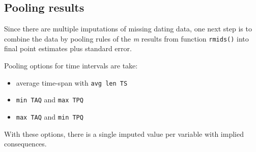 \documentclass[a4paper,11pt]{memoir}
\providecommand{\tightlist}{%
  \setlength{\itemsep}{0pt}\setlength{\parskip}{0pt}}
\begin{document}
\hypertarget{pooling-results}{%
\subsection{Pooling results}\label{pooling-results}}

Since there are multiple imputations of missing dating data, one next
step is to combine the data by pooling rules of the \emph{m} results
from function \texttt{rmids()} into final point estimates plus standard
error.

Pooling options for time intervals are take:

\begin{itemize}
\tightlist
\item
  average time-span with \texttt{avg\ len\ TS}
\item
  \texttt{min\ TAQ} and \texttt{max\ TPQ}
\item
  \texttt{max\ TAQ} and \texttt{min\ TPQ}
\end{itemize}

With these options, there is a single imputed value per variable with
implied consequences.
\end{document}

